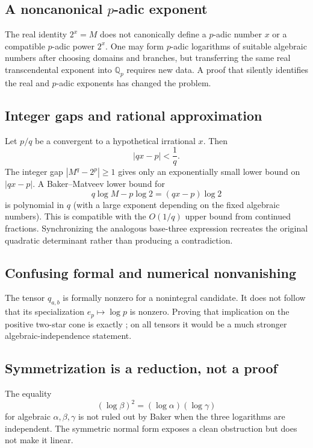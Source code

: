 \documentclass[11pt]{article}
\theoremstyle{definition}
\theoremstyle{remark}
\newcommand{\Q}{\mathbb{Q}}
\begin{document}
\subsection{A noncanonical \texorpdfstring{$p$}{p}-adic exponent}

The real identity $2^x=M$ does not canonically define a $p$-adic number $x$ or a compatible
$p$-adic power $2^x$.  One may form $p$-adic logarithms of suitable algebraic numbers after
choosing domains and branches, but transferring the same real transcendental exponent into
$\Q_p$ requires new data.  A proof that silently identifies the real and $p$-adic exponents
has changed the problem.

\subsection{Integer gaps and rational approximation}

Let $p/q$ be a convergent to a hypothetical irrational $x$.  Then
\[
 |qx-p|<\frac1q.
\]
The integer gap $|M^q-2^p|\ge1$ gives only an exponentially small lower bound on
$|qx-p|$.  A Baker--Matveev lower bound for
\[
 q\log M-p\log2=(qx-p)\log2
\]
is polynomial in $q$ (with a large exponent depending on the fixed algebraic numbers).
This is compatible with the $O(1/q)$ upper bound from continued fractions.  Synchronizing
the analogous base-three expression recreates the original quadratic determinant rather
than producing a contradiction.

\subsection{Confusing formal and numerical nonvanishing}

The tensor $q_{a,b}$ is formally nonzero for a nonintegral candidate.  It does not follow
that its specialization $e_p\mapsto\log p$ is nonzero.  Proving that implication on the
positive two-star cone is exactly ; on all tensors it would
be a much stronger algebraic-independence statement.

\subsection{Symmetrization is a reduction, not a proof}

The equality
\[
 (\log\beta)^2=(\log\alpha)(\log\gamma)
\]
for algebraic $\alpha,\beta,\gamma$ is not ruled out by Baker when the three logarithms are
independent.  The symmetric normal form exposes a clean obstruction but does not make it
linear.
\end{document}
